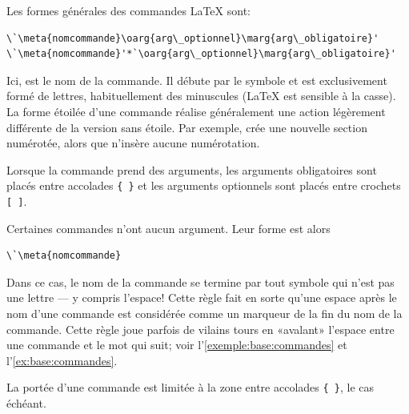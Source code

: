 Les formes générales des commandes {\LaTeX} sont:
\begin{lstlisting}
\`\meta{nomcommande}\oarg{arg\_optionnel}\marg{arg\_obligatoire}'
\`\meta{nomcommande}'*`\oarg{arg\_optionnel}\marg{arg\_obligatoire}'
\end{lstlisting}
Ici,  est le nom de la commande. Il débute par le
symbole {\bs} et est exclusivement formé de lettres, habituellement
des minuscules ({\LaTeX} est sensible à la casse). La forme étoilée
d'une commande réalise généralement une action légèrement différente
de la version sans étoile. Par exemple, \cmd{\section} crée une
nouvelle section numérotée, alors que \cmd{\section*} n'insère aucune
numérotation.

Lorsque la commande prend des arguments, les arguments obligatoires
sont placés entre accolades \verb={ }= et les arguments optionnels
sont placés entre crochets \verb=[ ]=.

Certaines commandes n'ont aucun argument. Leur forme est alors
\begin{lstlisting}
\`\meta{nomcommande}
\end{lstlisting}
Dans ce cas, le nom de la commande se termine par tout symbole qui
n'est pas une lettre --- y compris l'espace! Cette règle fait en sorte
qu'une espace après le nom d'une commande est considérée comme un
marqueur de la fin du nom de la commande. Cette règle joue parfois de
vilains tours en «avalant» l'espace entre une commande et le mot qui
suit; voir l'\autoref{exemple:base:commandes} et
l'\autoref{ex:base:commandes}.

La portée d'une commande est limitée à la zone entre accolades
\verb={ }=, le cas échéant.

